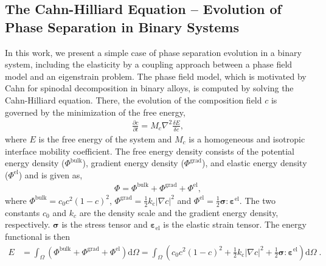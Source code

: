 \documentclass[11pt, authoryear]{elsarticle}
\begin{document}
\begin{appendix}
		\subsection{The Cahn-Hilliard Equation -- Evolution of Phase Separation in Binary Systems}
		In this work, we present a simple case of phase separation evolution in a binary system, including the elasticity by a coupling approach between a phase field model and an eigenstrain problem. 
		The phase field model, which is motivated by Cahn \citep{cahn1961spinodal} for spinodal decomposition in binary alloys, is computed by solving the Cahn-Hilliard equation. There, the evolution of the composition field $c$ is governed  by the minimization of the free energy, 
		\begin{align}
			\label{eq:cahn_hilliard}
			\frac{\partial c}{\partial t} = M_c \nabla^2 \frac{\delta E}{\delta c},
		\end{align}
		where $E$ is the free energy of the system and $M_c$ is a homogeneous and isotropic interface mobility coefficient.
		The free energy density consists of the potential energy density ($\Phi^{\mathrm{bulk}}$), gradient energy density ($\Phi^{\mathrm{grad}}$), and elastic energy density ($\Phi^{\mathrm{el}}$) and is given as,
		\begin{align}
			\label{eq:energy}
			\Phi = \Phi^{\mathrm{bulk}}+\Phi^{\mathrm{grad}}+\Phi^{\mathrm{el}},
		\end{align}
		where $\Phi^{\mathrm{bulk}} = c_0 c^2(1-c)^2$, $\Phi^{\mathrm{grad}} = \frac{1}{2} k_{\mathrm{c}} |\nabla c|^2$ and $\Phi^{\mathrm{el}} = \frac{1}{2} \boldsymbol{\sigma} : \boldsymbol{\varepsilon}^{\mathrm{el}}$. The two constants $c_0$ and $k_c$ are the density scale and the gradient energy density, respectively. $\boldsymbol{\sigma}$ is the stress tensor and $\boldsymbol{\varepsilon}_{\mathrm{el}}$ is the elastic strain tensor. The energy functional is then	
		\begin{align}
			\label{eq:energy_tot}
			E 	&= \int_{\Omega} (\Phi^{\mathrm{bulk}}+\Phi^{\mathrm{grad}}+\Phi^{\mathrm{el}})\mathrm{d}\Omega  
			= \int_{\Omega} (c_0 c^2(1-c)^2+\frac{1}{2} k_{\mathrm{c}} |\nabla c|^2+\frac{1}{2} \boldsymbol{\sigma} : \boldsymbol{\varepsilon}^{\mathrm{el}})\mathrm{d}\Omega\;.
		\end{align}
		

\end{appendix}
\end{document}
